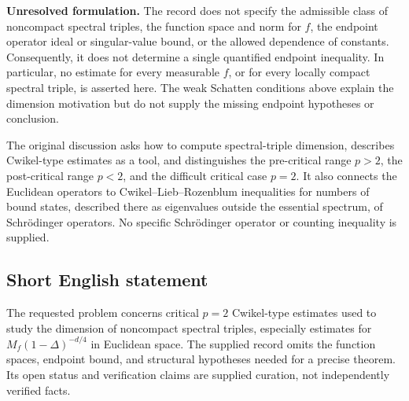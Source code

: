 \documentclass[11pt]{article}
\begin{document}
\textbf{Unresolved formulation.} The record does not specify the admissible class of noncompact spectral triples, the function space and norm for \(f\), the endpoint operator ideal or singular-value bound, or the allowed dependence of constants. Consequently, it does not determine a single quantified endpoint inequality. In particular, no estimate for every measurable \(f\), or for every locally compact spectral triple, is asserted here. The weak Schatten conditions above explain the dimension motivation but do not supply the missing endpoint hypotheses or conclusion.

The original discussion asks how to compute spectral-triple dimension, describes Cwikel-type estimates as a tool, and distinguishes the pre-critical range \(p>2\), the post-critical range \(p<2\), and the difficult critical case \(p=2\). It also connects the Euclidean operators to Cwikel--Lieb--Rozenblum inequalities for numbers of bound states, described there as eigenvalues outside the essential spectrum, of Schr\"odinger operators. No specific Schr\"odinger operator or counting inequality is supplied.
\subsection{Short English statement}
The requested problem concerns critical \(p=2\) Cwikel-type estimates used to study the dimension of noncompact spectral triples, especially estimates for \(M_f(1-\Delta)^{-d/4}\) in Euclidean space. The supplied record omits the function spaces, endpoint bound, and structural hypotheses needed for a precise theorem. Its open status and verification claims are supplied curation, not independently verified facts.
\end{document}
